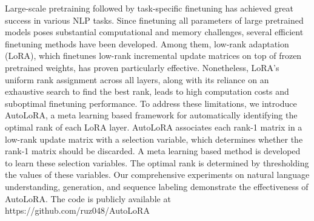 Large-scale pretraining followed by task-specific finetuning has achieved great success in various NLP tasks. Since finetuning all parameters of large pretrained models poses substantial computational and memory challenges, several efficient finetuning methods have been developed. Among them, low-rank adaptation (LoRA), which finetunes low-rank incremental update matrices on top of frozen pretrained weights, has proven particularly effective. Nonetheless, LoRA's uniform rank assignment across all layers, along with its reliance on an exhaustive search to find the best rank, leads to high computation costs and suboptimal finetuning performance. To address these limitations, we introduce AutoLoRA, a meta learning based framework for automatically identifying the optimal rank of each LoRA layer. AutoLoRA associates each rank-1 matrix in a low-rank update matrix with a selection variable, which determines whether the rank-1 matrix should be discarded. A meta learning based method is developed to learn these selection variables. The optimal rank is determined by thresholding the values of these variables. Our comprehensive experiments on natural language understanding, generation, and sequence labeling demonstrate the effectiveness of AutoLoRA. The code is publicly available at https://github.com/ruz048/AutoLoRA